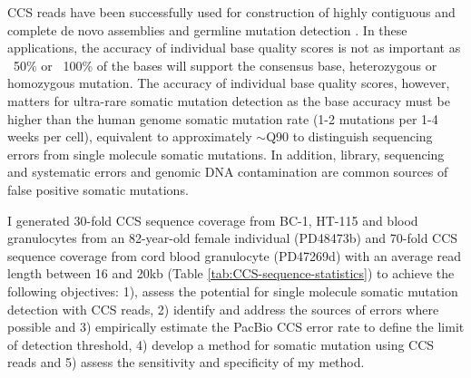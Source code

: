 CCS reads have been successfully used for construction of highly contiguous and complete de novo assemblies \cite{} and germline mutation detection \cite{}. In these applications, the accuracy of individual base quality scores is not as important as ~50\% or ~100\% of the bases will support the consensus base, heterozygous or homozygous mutation. The accuracy of individual base quality scores, however, matters for ultra-rare somatic mutation detection as the base accuracy must be higher than the human genome somatic mutation rate (1-2 mutations per 1-4 weeks per cell), equivalent to approximately $\sim$Q90 to distinguish sequencing errors from single molecule somatic mutations. In addition, library, sequencing and systematic errors and genomic DNA contamination are common sources of false positive somatic mutations. 

I generated 30-fold CCS sequence coverage from BC-1, HT-115 and blood granulocytes from an 82-year-old female individual (PD48473b) and 70-fold CCS sequence coverage from cord blood granulocyte (PD47269d) with an average read length between 16 and 20kb (Table \ref{tab:CCS-sequence-statistics}) to achieve the following objectives: 1), assess the potential for single molecule somatic mutation detection with CCS reads, 2) identify and address the sources of errors where possible and 3) empirically estimate the PacBio CCS error rate to define the limit of detection threshold, 4) develop a method for somatic mutation using CCS reads and 5) assess the sensitivity and specificity of my method.

